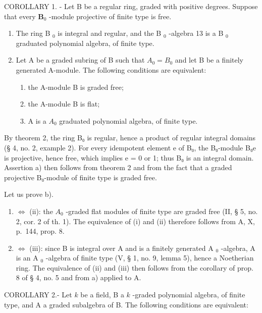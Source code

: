 COROLLARY 1. - Let B be a regular ring, graded with positive degrees. Suppose that every \(\mathbf{B}_0\) -module projective of finite type is free.

\begin{enumerate}
\def\labelenumi{\alph{enumi})}
\item
  The ring B \(_{0}\) is integral and regular, and the B \(_{0}\) -algebra 13 is a B \(_{0}\) graduated polynomial algebra, of finite type.
\item
  Let A be a graded subring of B such that \(A_{0} = B_{0}\) and let B be a finitely generated A-module. The following conditions are equivalent:
  \begin{enumerate}
  \def\labelenumii{(\roman{enumii})}
  \item
  the A-module B is graded free;
  \item
  the A-module B is flat;
  \item
  A is a \(A_{0}\) graduated polynomial algebra, of finite type.
  \end{enumerate}
\end{enumerate}

By theorem 2, the ring B₀ is regular, hence a product of regular integral domains (§ 4, no. 2, example 2). For every idempotent element e of B₀, the B₀-module B₀e is projective, hence free, which implies e = 0 or 1; thus B₀ is an integral domain. Assertion a) then follows from theorem 2 and from the fact that a graded projective B₀-module of finite type is graded free.

Let us prove b).

\begin{enumerate}
\def\labelenumi{(\roman{enumi})}
\item
  \(\Leftrightarrow\) (ii): the \(A_0\) -graded flat modules of finite type are graded free (II, § 5, no. 2, cor. 2 of th. 1). The equivalence of (i) and (ii) therefore follows from A, X, p.~144, prop. 8.
\item
  \(\Leftrightarrow\) (iii): since B is integral over A and is a finitely generated A \(_0\) -algebra, A is an A \(_0\) -algebra of finite type (V, § 1, no. 9, lemma 5), hence a Noetherian ring. The equivalence of (ii) and (iii) then follows from the corollary of prop. 8 of § 4, no. 5 and from a) applied to A.
\end{enumerate}

COROLLARY 2.- Let \(k\) be a field, B a \(k\) -graded polynomial algebra, of finite type, and A a graded subalgebra of B. The following conditions are equivalent:

